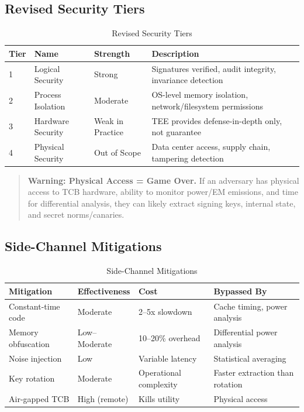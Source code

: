 \documentclass[11pt,letterpaper]{article}
\theoremstyle{definition}
\theoremstyle{remark}
\begin{document}
\subsection{Revised Security Tiers}

\begin{table}[h]
\centering
\begin{tabular}{@{}llll@{}}
\toprule
\textbf{Tier} & \textbf{Name} & \textbf{Strength} & \textbf{Description} \\
\midrule
1 & Logical Security & Strong & Signatures verified, audit integrity, invariance detection \\
2 & Process Isolation & Moderate & OS-level memory isolation, network/filesystem permissions \\
3 & Hardware Security & Weak in Practice & TEE provides defense-in-depth only, not guarantee \\
4 & Physical Security & Out of Scope & Data center access, supply chain, tampering detection \\
\bottomrule
\end{tabular}
\caption{Revised Security Tiers}
\end{table}

\begin{quote}
\textbf{Warning: Physical Access = Game Over.} If an adversary has physical access to TCB hardware, ability to monitor power/EM emissions, and time for differential analysis, they can likely extract signing keys, internal state, and secret norms/canaries.
\end{quote}

\subsection{Side-Channel Mitigations}

\begin{table}[h]
\centering
\small
\begin{tabular}{@{}llll@{}}
\toprule
\textbf{Mitigation} & \textbf{Effectiveness} & \textbf{Cost} & \textbf{Bypassed By} \\
\midrule
Constant-time code & Moderate & 2--5x slowdown & Cache timing, power analysis \\
Memory obfuscation & Low--Moderate & 10--20\% overhead & Differential power analysis \\
Noise injection & Low & Variable latency & Statistical averaging \\
Key rotation & Moderate & Operational complexity & Faster extraction than rotation \\
Air-gapped TCB & High (remote) & Kills utility & Physical access \\
\bottomrule
\end{tabular}
\caption{Side-Channel Mitigations}
\end{table}
\end{document}
